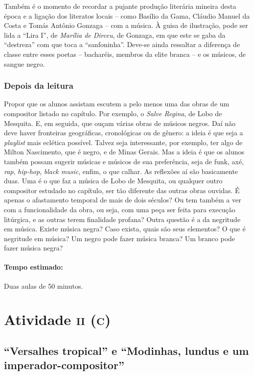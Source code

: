 \documentclass[11pt]{extarticle}
\begin{document}
Também é o momento de recordar a pujante produção literária mineira desta
época e a ligação dos literatos locais – como Basílio da Gama, Cláudio Manuel
da Costa e Tomás Antônio Gonzaga – com a música. À guisa de ilustração, pode
ser lida a ``Lira I'', de \emph{Marília de Dirceu}, de Gonzaga, em que este se gaba da
“destreza” com que toca a “sanfoninha”. Deve-se ainda ressaltar a diferença de
classe entre esses poetas – bacharéis, membros da elite branca –  e os músicos,
de sangue negro.

\subsubsection{Depois da leitura}

Propor que os alunos assistam escutem a pelo menos uma das obras de um
compositor listado no capítulo. Por exemplo, o \emph{Salve Regina}, de Lobo de
Mesquita. E, em seguida, que ouçam várias obras de músicos negros. Daí não deve
haver fronteiras geográficas, cronológicas ou de gênero: a ideia é que seja a
\textit{playlist} mais eclética possível. Talvez seja interessante, por exemplo, ter
algo de Milton Nascimento, que é negro, e de Minas Gerais. Mas a ideia é que os
alunos também possam sugerir músicas e músicos de sua preferência, seja de
funk, axé, \textit{rap}, \textit{hip-hop}, \textit{black music}, enfim, o que calhar. As reflexões aí são
basicamente duas. Uma é o que faz a música de Lobo de Mesquita, ou qualquer
outro compositor estudado no capítulo, ser tão diferente das outras obras
ouvidas. É apenas o afastamento temporal de mais de dois séculos? Ou tem também
a ver com a funcionalidade da obra, ou seja, com uma peça ser feita para
execução litúrgica, e as outras terem finalidade profana? Outra questão é a da
negritude em música. Existe música negra? Caso exista, quais são seus
elementos? O que é negritude em música? Um negro pode fazer música branca? Um
branco pode fazer música negra?

\paragraph{Tempo estimado:} Duas aulas de 50 minutos. 

\section{Atividade \textsc{ii (c)}}

\subsection{“Versalhes tropical” e “Modinhas, lundus e um
imperador-compositor”}
\end{document}
